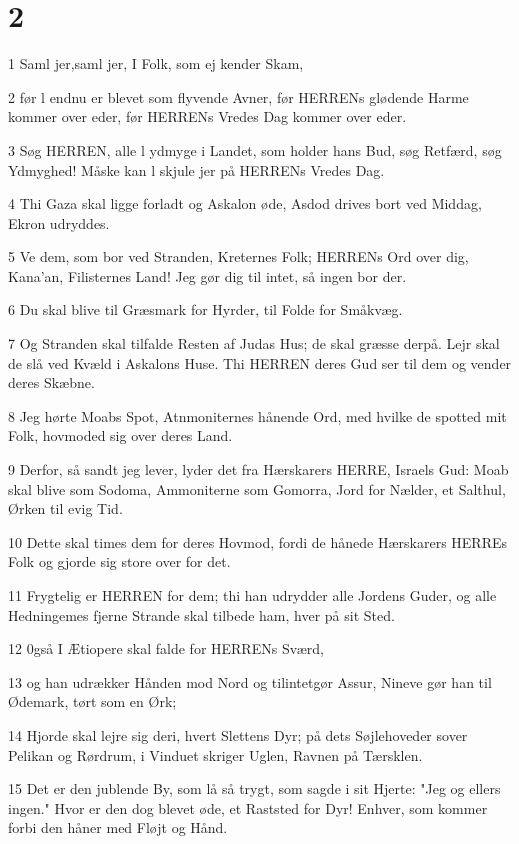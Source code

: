 \chapter{2}

\par 1 Saml jer,saml jer, I Folk, som ej kender Skam,
\par 2 før l endnu er blevet som flyvende Avner, før HERRENs glødende Harme kommer over eder, før HERRENs Vredes Dag kommer over eder.
\par 3 Søg HERREN, alle l ydmyge i Landet, som holder hans Bud, søg Retfærd, søg Ydmyghed! Måske kan l skjule jer på HERRENs Vredes Dag.
\par 4 Thi Gaza skal ligge forladt og Askalon øde, Asdod drives bort ved Middag, Ekron udryddes.
\par 5 Ve dem, som bor ved Stranden, Kreternes Folk; HERRENs Ord over dig, Kana'an, Filisternes Land! Jeg gør dig til intet, så ingen bor der.
\par 6 Du skal blive til Græsmark for Hyrder, til Folde for Småkvæg.
\par 7 Og Stranden skal tilfalde Resten af Judas Hus; de skal græsse derpå. Lejr skal de slå ved Kvæld i Askalons Huse. Thi HERREN deres Gud ser til dem og vender deres Skæbne.
\par 8 Jeg hørte Moabs Spot, Atnmoniternes hånende Ord, med hvilke de spotted mit Folk, hovmoded sig over deres Land.
\par 9 Derfor, så sandt jeg lever, lyder det fra Hærskarers HERRE, Israels Gud: Moab skal blive som Sodoma, Ammoniterne som Gomorra, Jord for Nælder, et Salthul, Ørken til evig Tid.
\par 10 Dette skal times dem for deres Hovmod, fordi de hånede Hærskarers HERREs Folk og gjorde sig store over for det.
\par 11 Frygtelig er HERREN for dem; thi han udrydder alle Jordens Guder, og alle Hedningemes fjerne Strande skal tilbede ham, hver på sit Sted.
\par 12 0gså I Ætiopere skal falde for HERRENs Sværd,
\par 13 og han udrækker Hånden mod Nord og tilintetgør Assur, Nineve gør han til Ødemark, tørt som en Ørk;
\par 14 Hjorde skal lejre sig deri, hvert Slettens Dyr; på dets Søjlehoveder sover Pelikan og Rørdrum, i Vinduet skriger Uglen, Ravnen på Tærsklen.
\par 15 Det er den jublende By, som lå så trygt, som sagde i sit Hjerte: "Jeg og ellers ingen." Hvor er den dog blevet øde, et Raststed for Dyr! Enhver, som kommer forbi den håner med Fløjt og Hånd.

